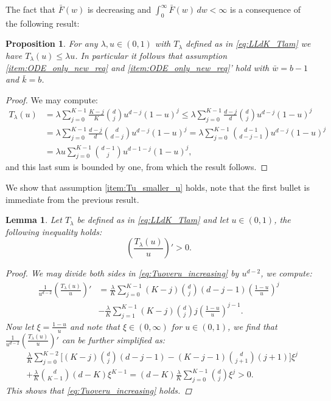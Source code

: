 \documentclass[12pt]{report}
\newtheorem{proposition}[theorem]{Proposition}
\newtheorem{lemma}[theorem]{Lemma}
\begin{document}
The fact that $\bar F(w)$ is decreasing and $\int_0^\infty \bar F(w) \, dw < \infty$
is a consequence of the following result:
\begin{proposition}\label{prop:SQdK_recursion_correct}
For any $\lambda, u \in (0,1)$ with $T_\lambda$ defined as in \eqref{eq:LLdK_Tlam} we have $T_{\lambda}(u) \leq \lambda u$. In particular it follows that assumption \ref{item:ODE_only_new_req} and \ref{item:ODE_only_new_req}' hold with $\bar w = b-1$ and $\bar k = b$.
\end{proposition}
\begin{proof}
We may compute:
\begin{align*}
T_\lambda(u)  &= \lambda \sum_{j=0}^{K-1} \frac{K-j}{K} \binom{d}{j} u^{d-j}
(1-u)^j \leq \lambda \sum_{j=0}^{K-1} \frac{d-j}{d} \binom{d}{j} u^{d-j} (1-u)^j\\
&= \lambda \sum_{j=0}^{K-1} \frac{d-j}{d} \binom{d}{d-j} u^{d-j} (1-u)^j= \lambda \sum_{j=0}^{K-1} \binom{d-1}{d-j-1} u^{d-j} (1-u)^j\\
& = \lambda u \sum_{j=0}^{K-1} \binom{d-1}{j} u^{d-1-j} (1-u)^j,
\end{align*}
and this last sum is bounded by one, from which the result follows.
\end{proof}
We show that assumption \ref{item:Tu_smaller_u} holds,
note that the first bullet is immediate from the previous result.
\begin{lemma}\label{lem:Tuoveru_increasing_SQdK}
Let $T_\lambda$ be defined as in \eqref{eq:LLdK_Tlam} and let $u \in (0,1)$, the following inequality holds:
\begin{equation}\label{eq:Tuoveru_increasing}
\left(\frac{T_\lambda(u)}{u}\right)' > 0.
\end{equation}
\begin{proof}
We may divide both sides in \eqref{eq:Tuoveru_increasing} by $u^{d-2}$, we compute:
\begin{align*}
\frac{1}{u^{d-2}}\left( \frac{T_\lambda(u)}{u} \right)'
&= \frac{\lambda}{K} \sum_{j=0}^{K-1} (K-j) \binom{d}{j} (d-j-1) \left( \frac{1-u}{u} \right)^j \\
&- \frac{\lambda}{K} \sum_{j=1}^{K-1} (K-j) \binom{d}{j} j \left( \frac{1-u}{u} \right) ^{j-1}.
\end{align*}
Now let $\xi = \frac{1-u}{u}$ and note that $\xi \in (0,\infty)$ for $u \in (0,1)$, we find that $\frac{1}{u^{d-2}}\left( \frac{T_\lambda(u)}{u} \right)'$ can be further simplified as:
\begin{align*}
&\frac{\lambda}{K} \sum_{j=0}^{K-2} \bigg[ (K-j) \binom{d}{j} (d-j-1) - (K-j-1) \binom{d}{j+1} (j+1)\bigg] \xi^j \\
&+ \frac{\lambda}{K} \binom{d}{K-1} (d-K) \xi^{K-1} = (d-K) \frac{\lambda}{K} \sum_{j=0}^{K-1} \binom{d}{j} \xi^j > 0.
\end{align*}
This shows that \eqref{eq:Tuoveru_increasing} holds.
\end{proof}
\end{lemma}
\end{document}
